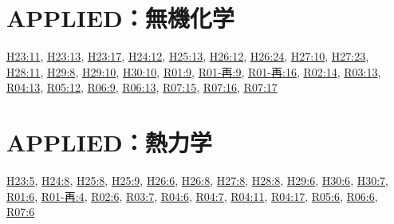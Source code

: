 \section{APPLIED：無機化学}
\hyperref[q:h23-reg-applied-11]{H23:11}, \hyperref[q:h23-reg-applied-13]{H23:13}, \hyperref[q:h23-reg-applied-17]{H23:17}, \hyperref[q:h24-reg-applied-12]{H24:12}, \hyperref[q:h25-reg-applied-13]{H25:13}, \hyperref[q:h26-reg-applied-12]{H26:12}, \hyperref[q:h26-reg-applied-24]{H26:24}, \hyperref[q:h27-reg-applied-10]{H27:10}, \hyperref[q:h27-reg-applied-23]{H27:23}, \hyperref[q:h28-reg-applied-11]{H28:11}, \hyperref[q:h29-reg-applied-08]{H29:8}, \hyperref[q:h29-reg-applied-10]{H29:10}, \hyperref[q:h30-reg-applied-10]{H30:10}, \hyperref[q:r01-reg-applied-09]{R01:9}, \hyperref[q:r01-ret-applied-09]{R01-再:9}, \hyperref[q:r01-ret-applied-16]{R01-再:16}, \hyperref[q:r02-reg-applied-14]{R02:14}, \hyperref[q:r03-reg-applied-13]{R03:13}, \hyperref[q:r04-reg-applied-13]{R04:13}, \hyperref[q:r05-reg-applied-12]{R05:12}, \hyperref[q:r06-reg-applied-09]{R06:9}, \hyperref[q:r06-reg-applied-13]{R06:13}, \hyperref[q:r07-reg-applied-15]{R07:15}, \hyperref[q:r07-reg-applied-16]{R07:16}, \hyperref[q:r07-reg-applied-17]{R07:17}
\section{APPLIED：熱力学}
\hyperref[q:h23-reg-applied-05]{H23:5}, \hyperref[q:h24-reg-applied-08]{H24:8}, \hyperref[q:h25-reg-applied-08]{H25:8}, \hyperref[q:h25-reg-applied-09]{H25:9}, \hyperref[q:h26-reg-applied-06]{H26:6}, \hyperref[q:h26-reg-applied-08]{H26:8}, \hyperref[q:h27-reg-applied-08]{H27:8}, \hyperref[q:h28-reg-applied-08]{H28:8}, \hyperref[q:h29-reg-applied-06]{H29:6}, \hyperref[q:h30-reg-applied-06]{H30:6}, \hyperref[q:h30-reg-applied-07]{H30:7}, \hyperref[q:r01-reg-applied-06]{R01:6}, \hyperref[q:r01-ret-applied-04]{R01-再:4}, \hyperref[q:r02-reg-applied-06]{R02:6}, \hyperref[q:r03-reg-applied-07]{R03:7}, \hyperref[q:r04-reg-applied-06]{R04:6}, \hyperref[q:r04-reg-applied-07]{R04:7}, \hyperref[q:r04-reg-applied-11]{R04:11}, \hyperref[q:r04-reg-applied-17]{R04:17}, \hyperref[q:r05-reg-applied-06]{R05:6}, \hyperref[q:r06-reg-applied-06]{R06:6}, \hyperref[q:r07-reg-applied-06]{R07:6}
